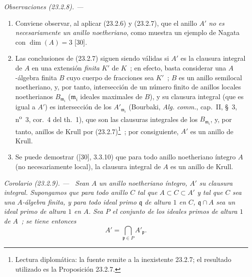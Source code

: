 \documentclass[10pt,oneside]{book}
\makeatletter
\newcommand{\setmanualcurrentlabel}[1]{\def\@currentlabel{#1}}
\newenvironment{corollary}[1][]{%
  \setmanualcurrentlabel{#1}\par\medskip\noindent\itshape Corolario (#1). ---\ }{\par}
\newenvironment{remarks}[1][]{%
  \setmanualcurrentlabel{#1}\par\medskip\noindent\itshape Observaciones (#1). ---\ }{\par}
\makeatother
\begin{document}
\begin{remarks}[23.2.8]
\label{0.23.2.8-es}
\begin{enumerate}
  \item[(i)] Conviene observar, al aplicar (23.2.6) y
  (23.2.7), que el anillo $A'$ \emph{no es necesariamente un anillo
  noetheriano}, como muestra un ejemplo de Nagata con $\dim(A)=3$ [30].

  \item[(ii)] Las conclusiones de (23.2.7) siguen siendo válidas si $A'$ es
  la clausura integral de $A$ en una extensión \emph{finita} $K'$ de $K$~; en efecto,
  basta considerar una $A$-álgebra finita $B$ cuyo cuerpo de fracciones sea
  $K'$~; $B$ es un anillo semilocal noetheriano, y, por tanto,
  intersección de un número finito de anillos locales noetherianos
  $B_{\mathfrak m_i}$ ($\mathfrak m_i$ ideales maximales de $B$), y su clausura
  integral (que es igual a $A'$) es intersección de los
  $A'_{\mathfrak m_i}$ (Bourbaki, \emph{Alg. comm.}, cap.~II, §~3,
  n\textsuperscript{o}~3, cor.~4 del th.~1), que son las clausuras integrales
  de los $B_{\mathfrak m_i}$, y, por tanto, anillos de Krull por (23.2.7)\footnote{Lectura diplomática: la fuente remite a la inexistente 23.2.7; el resultado utilizado es la Proposición 23.2.7.}~; por
  consiguiente, $A'$ es un anillo de Krull.

  \item[(iii)] Se puede demostrar ([30], 3.3.10) que para todo anillo noetheriano
  íntegro $A$ (no necesariamente local), la clausura integral de $A$ es un
  anillo de Krull.
\end{enumerate}
\end{remarks}

\begin{corollary}[23.2.9]
\label{0.23.2.9-es}
Sean $A$ un anillo noetheriano íntegro, $A'$ su clausura integral. Supongamos
que para todo anillo $C$ tal que $A\subset C\subset A'$ y tal que $C$ sea
una $A$-álgebra finita, y para todo ideal primo $\mathfrak q$ de altura $1$
en $C$, $\mathfrak q\cap A$ sea un ideal primo de altura $1$ en $A$.
Sea $P$ el conjunto de los ideales primos de altura $1$ de $A$~; se tiene entonces
\[
  A'=\bigcap_{\mathfrak p\in P}A'_{\mathfrak p}.
\]
\end{corollary}
\end{document}
